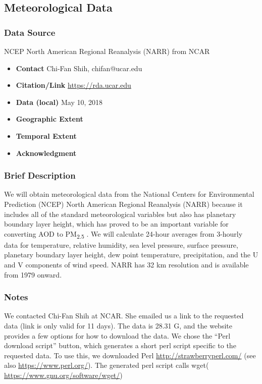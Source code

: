 \subsection{Meteorological Data}
\subsubsection*{Data Source} NCEP North American Regional Reanalysis (NARR) from NCAR
\begin{itemize}[nolistsep]
\item \textbf{Contact} Chi-Fan Shih, chifan@ucar.edu
\item \textbf{Citation/Link} \url{https://rda.ucar.edu}
\item \textbf{Data (local)} May 10, 2018
\item \textbf{Geographic Extent}
\item \textbf{Temporal Extent}
\item \textbf{Acknowledgment}
\end{itemize}
\subsubsection*{Brief Description}

We will obtain meteorological data from the National Centers for Environmental Prediction (NCEP) North American Regional Reanalysis (NARR) \citep{Mesinger2006,NCEPReanalysis2005} because it includes all of the standard meteorological variables but also has planetary boundary layer height, which has proved to be an important variable for converting AOD to PM\textsubscript{2.5} \citep{liu_estimating_2005}. We will calculate 24-hour averages from 3-hourly data for temperature, relative humidity, sea level pressure, surface pressure, planetary boundary layer height, dew point temperature, precipitation, and the U and V components of wind speed. NARR has 32 km resolution and is available from 1979 onward. 

\subsubsection*{Notes}

We contacted Chi-Fan Shih at NCAR. She emailed us a link to the requested data (link is only valid for 11 days). The data is 28.31 G, and the website provides a few options for how to download the data. We chose the ``Perl download script'' button, which generates a short perl script specific to the requested data. To use this, we downloaded Perl \url{http://strawberryperl.com/} (see also \url{https://www.perl.org/}). The generated perl script calls wget( \url{https://www.gnu.org/software/wget/})

